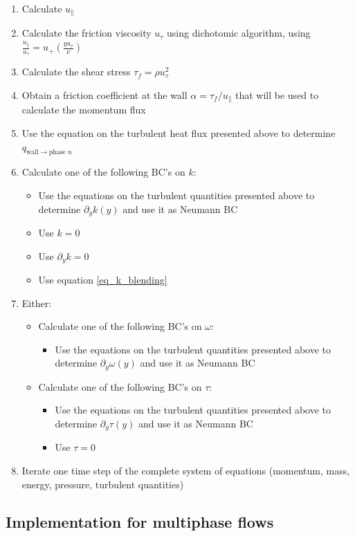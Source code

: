 \begin{enumerate}
	\item Calculate $u_\parallel$
	\item Calculate the friction viscosity $u_\tau$ using dichotomic algorithm, using $\frac{u_\parallel}{u_\tau} = u_+(\frac{y u_\tau}{\nu})$
	\item Calculate the shear stress $\tau_f = \rho u_\tau^2$
	\item Obtain a friction coefficient at the wall $\alpha = \tau_f / u_\parallel$ that will be used to calculate the momentum flux
	\item Use the equation on the turbulent heat flux presented above to determine $q_{\text{wall}\rightarrow\text{phase~}n}$
	\item Calculate one of the following BC's on $k$:
	\begin{itemize}
		\item Use the equations on the turbulent quantities presented above to determine $\partial_y k(y)$ and use it as Neumann BC
		\item Use $k=0$
		\item Use $\partial_y k=0$
		\item Use equation \eqref{eq_k_blending}
	\end{itemize} 
	\item Either:
	\begin{itemize}
		\item Calculate one of the following BC's on $\omega$:
		\begin{itemize}
			\item Use the equations on the turbulent quantities presented above to determine $\partial_y \omega(y)$ and use it as Neumann BC
		\end{itemize}
		\item Calculate one of the following BC's on $\tau$:
		\begin{itemize}
			\item Use the equations on the turbulent quantities presented above to determine $\partial_y \tau(y)$ and use it as Neumann BC
			\item Use $\tau = 0$
		\end{itemize}
	\end{itemize}
	\item Iterate one time step of the complete system of equations (momentum, mass, energy, pressure, turbulent quantities)
\end{enumerate}

\subsection{Implementation for multiphase flows}

